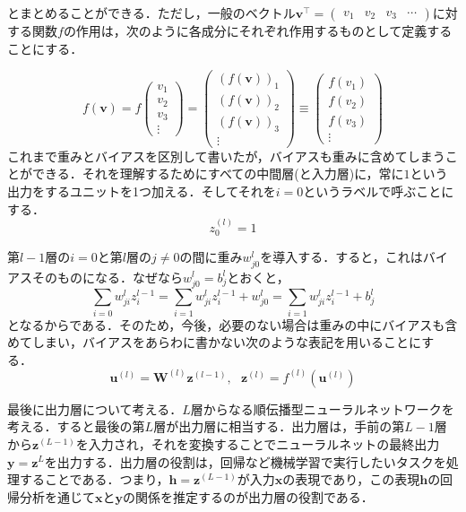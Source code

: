 \documentclass[a4paper,11pt]{jsreport}
\begin{document}
とまとめることができる．ただし，一般のベクトル$\bm{v}^{\top} = \begin{pmatrix} v_1 & v_2 & v_3 & \cdots \end{pmatrix}$に対する関数$f$の作用は，次のように各成分にそれぞれ作用するものとして定義することにする．\par
\begin{equation}
  f(\bm{v}) = f\begin{pmatrix}
    v_1 \\ v_2 \\ v_3 \\ \vdots
  \end{pmatrix} = \begin{pmatrix}
    (f(\bm{v}))_1 \\ (f(\bm{v}))_2 \\ (f(\bm{v}))_3 \\ \vdots
  \end{pmatrix} \equiv \begin{pmatrix}
    f(v_1) \\ f(v_2) \\ f(v_3) \\ \vdots
  \end{pmatrix}
\end{equation}
これまで重みとバイアスを区別して書いたが，バイアスも重みに含めてしまうことができる．それを理解するためにすべての中間層(と入力層)に，常に$1$という出力をするユニットを1つ加える．そしてそれを$i=0$というラベルで呼ぶことにする．
\begin{equation}
  z_0^{(l)} = 1
\end{equation}\par
第$l-1$層の$i=0$と第$l$層の$j \neq 0$の間に重み$w_{j0}^{l}$を導入する．すると，これはバイアスそのものになる．なぜなら$w_{j0}^l = b_j^l$とおくと，
\begin{equation}
  \sum_{i=0} w_{ji}^l z_i^{l-1}
  = \sum_{i=1} w_{ji}^l z_i^{l-1} + w_{j0}^l
  = \sum_{i=1} w_{ji}^l z_i^{l-1} + b_j^l
\end{equation}
となるからである．そのため，今後，必要のない場合は重みの中にバイアスも含めてしまい，バイアスをあらわに書かない次のような表記を用いることにする．
\begin{equation}
  \bm{u}^{(l)}
  = \bm{W}^{(l)} \bm{z}^{(l-1)}, \ \ \ \bm{z}^{(l)} = f^{(l)}\left( \bm{u}^{(l)} \right)
\end{equation}\par
最後に出力層について考える．$L$層からなる順伝播型ニューラルネットワークを考える．すると最後の第$L$層が出力層に相当する．出力層は，手前の第$L-1$層から$\bm{z}^{(L-1)}$を入力され，それを変換することでニューラルネットの最終出力$\bm{y}=\bm{z}^{L}$を出力する．出力層の役割は，回帰など機械学習で実行したいタスクを処理することである．つまり，$\bm{h}=\bm{z}^{(L-1)}$が入力$\bm{x}$の表現であり，この表現$\bm{h}$の回帰分析を通じて$\bm{x}$と$\bm{y}$の関係を推定するのが出力層の役割である．\par
\end{document}
